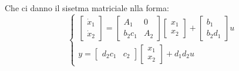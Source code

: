 Che ci danno il sisetma matriciale nlla forma:
\[
    \begin{cases}
        \left[\begin{matrix}
            \dot{x}_1\\\dot{x}_2
        \end{matrix}\right] = \left[\begin{matrix}
            A_1 & 0 \\ b_2 c_1 & A_2
        \end{matrix}\right] \left[\begin{matrix}
            x_1\\x_2
        \end{matrix}\right] + \left[\begin{matrix}
            b_1 \\b_2 d_1
        \end{matrix}\right] u\\
        y = \left[\begin{matrix}
            d_2c_1 & c_2
        \end{matrix}\right] \left[\begin{matrix}
            x_1\\x_2
        \end{matrix}\right] + d_1d_2 u
    \end{cases}
\]
